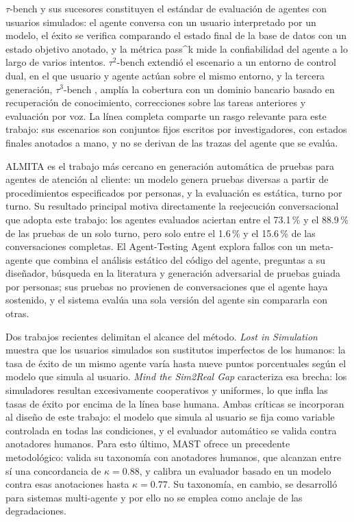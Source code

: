 $\tau$-bench \cite{yao2024taubench} y sus sucesores constituyen el estándar de evaluación de agentes con usuarios simulados: el agente conversa con un usuario interpretado por un modelo, el éxito se verifica comparando el estado final de la base de datos con un estado objetivo anotado, y la métrica pass\textasciicircum{}k mide la confiabilidad del agente a lo largo de varios intentos. $\tau^2$-bench \cite{barres2025tau2bench} extendió el escenario a un entorno de control dual, en el que usuario y agente actúan sobre el mismo entorno, y la tercera generación, $\tau^3$-bench \cite{sierra2026tau3bench}, amplía la cobertura con un dominio bancario basado en recuperación de conocimiento, correcciones sobre las tareas anteriores y evaluación por voz. La línea completa comparte un rasgo relevante para este trabajo: sus escenarios son conjuntos fijos escritos por investigadores, con estados finales anotados a mano, y no se derivan de las trazas del agente que se evalúa.
\par\vspace{6pt}
ALMITA \cite{arcadinho2024almita} es el trabajo más cercano en generación automática de pruebas para agentes de atención al cliente: un modelo genera pruebas diversas a partir de procedimientos especificados por personas, y la evaluación es estática, turno por turno. Su resultado principal motiva directamente la reejecución conversacional que adopta este trabajo: los agentes evaluados aciertan entre el 73.1\,\% y el 88.9\,\% de las pruebas de un solo turno, pero solo entre el 1.6\,\% y el 15.6\,\% de las conversaciones completas. El Agent-Testing Agent \cite{komoravolu2025ata} explora fallos con un meta-agente que combina el análisis estático del código del agente, preguntas a su diseñador, búsqueda en la literatura y generación adversarial de pruebas guiada por personas; sus pruebas no provienen de conversaciones que el agente haya sostenido, y el sistema evalúa una sola versión del agente sin compararla con otras.
\par\vspace{6pt}
Dos trabajos recientes delimitan el alcance del método. \textit{Lost in Simulation} \cite{seshadri2026lost} muestra que los usuarios simulados son sustitutos imperfectos de los humanos: la tasa de éxito de un mismo agente varía hasta nueve puntos porcentuales según el modelo que simula al usuario. \textit{Mind the Sim2Real Gap} \cite{zhou2026sim2real} caracteriza esa brecha: los simuladores resultan excesivamente cooperativos y uniformes, lo que infla las tasas de éxito por encima de la línea base humana. Ambas críticas se incorporan al diseño de este trabajo: el modelo que simula al usuario se fija como variable controlada en todas las condiciones, y el evaluador automático se valida contra anotadores humanos. Para esto último, MAST \cite{cemri2025mast} ofrece un precedente metodológico: valida su taxonomía con anotadores humanos, que alcanzan entre sí una concordancia de $\kappa = 0.88$, y calibra un evaluador basado en un modelo contra esas anotaciones hasta $\kappa = 0.77$. Su taxonomía, en cambio, se desarrolló para sistemas multi-agente y por ello no se emplea como anclaje de las degradaciones.
\par

